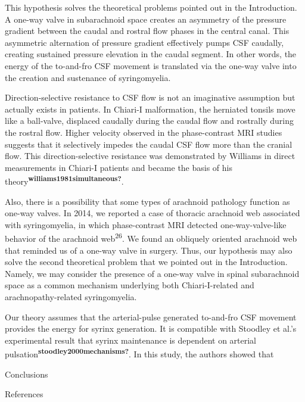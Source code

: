 \documentclass[a4paper,12pt]{article}
\begin{document}
This hypothesis solves the theoretical problems pointed out in the Introduction. A one-way valve in subarachnoid space creates an asymmetry of the pressure gradient between the caudal and rostral flow phases in the central canal. This asymmetric alternation of pressure gradient effectively pumps CSF caudally, creating sustained pressure elevation in the caudal segment. In other words, the energy of the to-and-fro CSF movement is translated via the one-way valve into the creation and sustenance of syringomyelia.

Direction-selective resistance to CSF flow is not an imaginative assumption but actually exists in patients. In Chiari-I malformation, the herniated tonsils move like a ball-valve, displaced caudally during the caudal flow and rostrally during the rostral flow. Higher velocity observed in the phase-contrast MRI studies suggests that it selectively impedes the caudal CSF flow more than the cranial flow. This direction-selective resistance was demonstrated by Williams in direct measurements in Chiari-I patients and became the basis of his theory\textsuperscript{\textbf{williams1981simultaneous?}}.

Also, there is a possibility that some types of arachnoid pathology function as one-way valves. In 2014, we reported a case of thoracic arachnoid web associated with syringomyelia, in which phase-contrast MRI detected one-way-valve-like behavior of the arachnoid web\textsuperscript{26}. We found an obliquely oriented arachnoid web that reminded us of a one-way valve in surgery. Thus, our hypothesis may also solve the second theoretical problem that we pointed out in the Introduction. Namely, we may consider the presence of a one-way valve in spinal subarachnoid space as a common mechanism underlying both Chiari-I-related and arachnopathy-related syringomyelia.

Our theory assumes that the arterial-pulse generated to-and-fro CSF movement provides the energy for syrinx generation. It is compatible with Stoodley et al.'s experimental result that syrinx maintenance is dependent on arterial pulsation\textsuperscript{\textbf{stoodley2000mechanisms?}}. In this study, the authors showed that

Conclusions

References
\end{document}
